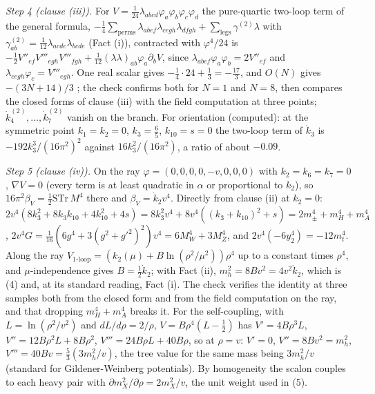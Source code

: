 \emph{Step 4 (clause (iii)).} For $V = \tfrac{1}{24}\lambda_{abcd}\varphi_{a}\varphi_{b}\varphi_{c}\varphi_{d}$ the pure-quartic two-loop term of the general formula, $-\tfrac14\sum_{\mathrm{perms}}\lambda_{abef}\lambda_{cegh}\lambda_{dfgh} + \sum_{\mathrm{legs}}\gamma^{(2)}\lambda$ with $\gamma^{(2)}_{ab} = \tfrac{1}{12}\lambda_{acde}\lambda_{bcde}$ (Fact (i)), contracted with $\varphi^{4}/24$ is $-\tfrac12V''_{ef}V'''_{egh}V'''_{fgh} + \tfrac{1}{12}(\lambda\lambda)_{ab}\varphi_{a}\partial_{b}V$, since $\lambda_{abef}\varphi_{a}\varphi_{b} = 2V''_{ef}$ and $\lambda_{cegh}\varphi_{c} = V'''_{egh}$. One real scalar gives $-\tfrac14\cdot24 + \tfrac13 = -\tfrac{17}{3}$, and $O(N)$ gives $-(3N + 14)/3$ \cite{KleinertSchulteFrohlinde2001}; the check confirms both for $N = 1$ and $N = 8$, then compares the closed forms of clause (iii) with the field computation at three points; $\dot k_{4}^{(2)}, \ldots, \dot k_{7}^{(2)}$ vanish on the branch. For orientation (computed): at the symmetric point $k_{1} = k_{2} = 0$, $k_{3} = \tfrac65$, $k_{10} = s = 0$ the two-loop term of $\dot k_{3}$ is $-192k_{3}^{3}/(16\pi^{2})^{2}$ against $16k_{3}^{2}/(16\pi^{2})$, a ratio of about $-0.09$.

\emph{Step 5 (clause (iv)).} On the ray $\varphi = (0, 0, 0, 0, -v, 0, 0, 0)$ with $k_{2} = k_{6} = k_{7} = 0$, $\nabla V = 0$ (every term is at least quadratic in $\alpha$ or proportional to $k_{2}$), so $16\pi^{2}\beta_{V} = \tfrac12\mathrm{STr}\,M^{4}$ there and $\beta_{V} = \dot k_{2}v^{4}$. Directly from clause (ii) at $k_{2} = 0$: $2v^{4}(8k_{3}^{2} + 8k_{3}k_{10} + 4k_{10}^{2} + 4s) = 8k_{3}^{2}v^{4} + 8v^{4}((k_{3} + k_{10})^{2} + s) = 2m_{\pm}^{4} + m_{H}^{4} + m_{A}^{4}$, $2v^{4}G = \tfrac{1}{16}(6g^{4} + 3(g^{2} + g'^{2})^{2})v^{4} = 6M_{W}^{4} + 3M_{Z}^{4}$, and $2v^{4}(-6y_{2}^{4}) = -12m_{t}^{4}$. Along the ray $V_{1\text{-loop}} = (k_{2}(\mu) + B\ln(\rho^{2}/\mu^{2}))\rho^{4}$ up to a constant times $\rho^{4}$, and $\mu$-independence gives $B = \tfrac12\dot k_{2}$; with Fact (ii), $m_{h}^{2} = 8Bv^{2} = 4v^{2}\dot k_{2}$, which is (4) and, at its standard reading, Fact (i). The check verifies the identity at three samples both from the closed form and from the field computation on the ray, and that dropping $m_{H}^{4} + m_{A}^{4}$ breaks it. For the self-coupling, with $L = \ln(\rho^{2}/v^{2})$ and $dL/d\rho = 2/\rho$, $V = B\rho^{4}(L - \tfrac12)$ has $V' = 4B\rho^{3}L$, $V'' = 12B\rho^{2}L + 8B\rho^{2}$, $V''' = 24B\rho L + 40B\rho$, so at $\rho = v$: $V' = 0$, $V'' = 8Bv^{2} = m_{h}^{2}$, $V''' = 40Bv = \tfrac53(3m_{h}^{2}/v)$, the tree value for the same mass being $3m_{h}^{2}/v$ (standard for Gildener-Weinberg potentials). By homogeneity the scalon couples to each heavy pair with $\partial m_{X}^{2}/\partial\rho = 2m_{X}^{2}/v$, the unit weight used in (5).

